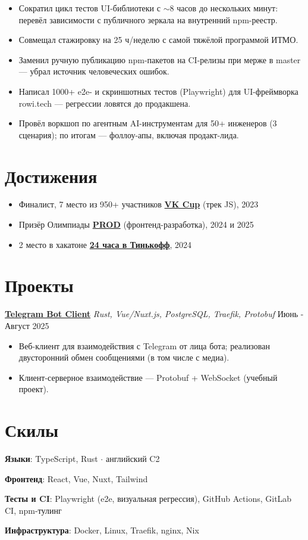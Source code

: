 \documentclass[11pt,a4paper]{article}
\begin{document}
\begin{itemize}[leftmargin=*,itemsep=1pt,topsep=2pt,parsep=0pt]
	\item Сократил цикл тестов UI-библиотеки с $\sim$8 часов до нескольких минут: перевёл зависимости с публичного зеркала на внутренний npm-реестр.
	\item Совмещал стажировку на 25 ч/неделю с самой тяжёлой программой ИТМО.
	\item Заменил ручную публикацию npm-пакетов на CI-релизы при мерже в master — убрал источник человеческих ошибок.
	\item Написал 1000+ e2e- и скриншотных тестов (Playwright) для UI-фреймворка rowi.tech — регрессии ловятся до продакшена.
	\item Провёл воркшоп по агентным AI-инструментам для 50+ инженеров (3 сценария); по итогам — фоллоу-апы, включая продакт-лида.
\end{itemize}

\section*{Достижения}
\begin{itemize}[leftmargin=*,itemsep=1pt,topsep=2pt,parsep=0pt]
	\item Финалист, 7 место из 950+ участников \href{https://vk.com/wall-41208167_2648}{\textbf{VK Cup}} (трек JS), 2023
	\item Призёр Олимпиады \href{https://prodcontest.com/eng}{\textbf{PROD}} (фронтенд-разработка), 2024 и 2025
	\item 2 место в хакатоне \href{https://education.tbank.ru/activities/tinkoff_projects/hackathon-24h/}{\textbf{24 часа в Тинькофф}}, 2024
\end{itemize}

\section*{Проекты}


\noindent\href{https://github.com/paranoidPhantom/eclipse}{\textbf{Telegram Bot Client}} \textit{Rust, Vue/Nuxt.js, PostgreSQL, Traefik, Protobuf} \hfill Июнь - Август 2025
\begin{itemize}[leftmargin=*,itemsep=1pt,topsep=2pt,parsep=0pt]
	\item Веб-клиент для взаимодействия с Telegram от лица бота; реализован двусторонний обмен сообщениями (в том числе с медиа).
	\item Клиент-серверное взаимодействие — Protobuf + WebSocket (учебный проект).
\end{itemize}


\section*{Скилы}

\noindent\textbf{Языки}: TypeScript, Rust $\cdot$ английский C2

\noindent\textbf{Фронтенд}: React, Vue, Nuxt, Tailwind

\noindent\textbf{Тесты и CI}: Playwright (e2e, визуальная регрессия), GitHub Actions, GitLab CI, npm-тулинг

\noindent\textbf{Инфраструктура}: Docker, Linux, Traefik, nginx, Nix
\end{document}
